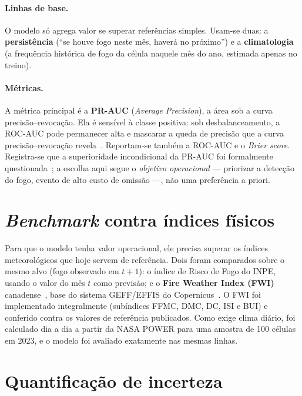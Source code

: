 \documentclass[tcc2]{uftex}
\begin{document}
\paragraph{Linhas de base.} O modelo só agrega valor se superar referências simples. Usam-se duas: a \textbf{persistência} (``se houve fogo neste mês, haverá no próximo'') e a \textbf{climatologia} (a frequência histórica de fogo da célula naquele mês do ano, estimada apenas no treino).

\paragraph{Métricas.} A métrica principal é a \textbf{PR-AUC} (\emph{Average Precision}), a área sob a curva precisão--revocação. Ela é sensível à classe positiva: sob desbalanceamento, a ROC-AUC pode permanecer alta e mascarar a queda de precisão que a curva precisão--revocação revela~\cite{saito2015precision,davis2006relationship}. Reportam-se também a ROC-AUC e o \emph{Brier score}. Registra-se que a superioridade incondicional da PR-AUC foi formalmente questionada~\cite{mcdermott2024closer}; a escolha aqui segue o \emph{objetivo operacional} --- priorizar a detecção do fogo, evento de alto custo de omissão ---, não uma preferência a priori.

\section{\emph{Benchmark} contra índices físicos}
\label{sec:metod_benchmark}

Para que o modelo tenha valor operacional, ele precisa superar os índices meteorológicos que hoje servem de referência. Dois foram comparados sobre o mesmo alvo (fogo observado em \(t+1\)): o índice de Risco de Fogo do INPE, usando o valor do mês \(t\) como previsão; e o \textbf{Fire Weather Index (FWI)} canadense~\cite{vanwagner1985fwi}, base do sistema GEFF/EFFIS do Copernicus~\cite{digiuseppe2024geff}. O FWI foi implementado integralmente (subíndices FFMC, DMC, DC, ISI e BUI) e conferido contra os valores de referência publicados. Como exige clima diário, foi calculado dia a dia a partir da NASA POWER para uma amostra de \num{100} células em 2023, e o modelo foi avaliado exatamente nas mesmas linhas.

\section{Quantificação de incerteza}
\label{sec:metod_conformal}
\end{document}
